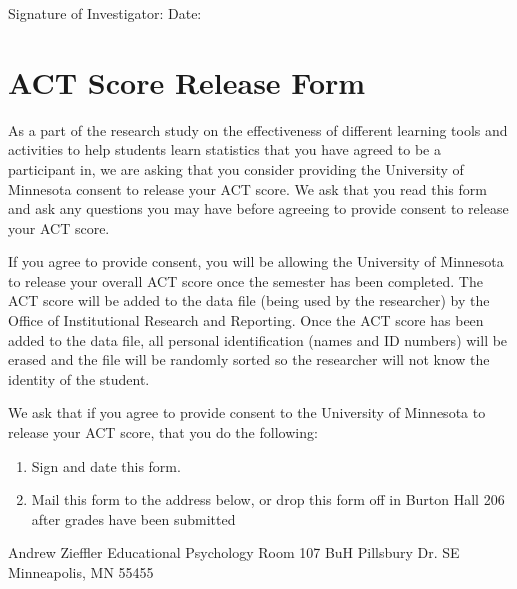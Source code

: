 \documentclass[11pt]{umnthesis}
\begin{document}
\noindent Signature of Investigator: \underline{\hspace{3in}} Date: \underline{\hspace{1in}}

\newpage

\hypertarget{act-score-release-form}{%
\section*{ACT Score Release Form}\label{act-score-release-form}}

As a part of the research study on the effectiveness of different learning tools and activities to help students learn statistics that you have agreed to be a participant in, we are asking that you consider providing the University of Minnesota consent to release your ACT score. We ask that you read this form and ask any questions you may have before agreeing to provide consent to release your ACT score.

\noindent If you agree to provide consent, you will be allowing the University of Minnesota to release your overall ACT score once the semester has been completed. The ACT score will be added to the data file (being used by the researcher) by the Office of Institutional Research and Reporting. Once the ACT score has been added to the data file, all personal identification (names and ID numbers) will be erased and the file will be randomly sorted so the researcher will not know the identity of the student.

\noindent We ask that if you agree to provide consent to the University of Minnesota to release your ACT score, that you do the following:

\begin{enumerate}
\def\labelenumi{(\arabic{enumi})}
\tightlist
\item
  Sign and date this form.
\item
  Mail this form to the address below, or drop this form off in Burton Hall 206 after grades
  have been submitted
\end{enumerate}

\noindent \hspace*{2in}

\begin{minipage}{.8\textwidth}
Andrew Zieffler \newline
Educational Psychology Room 107 BuH Pillsbury Dr. SE\newline
Minneapolis, MN 55455\newline
\end{minipage}
\end{document}
